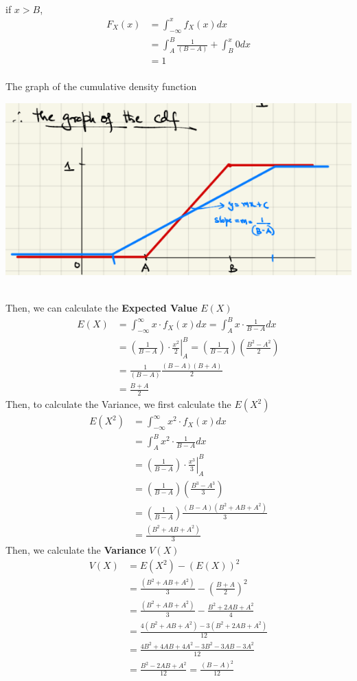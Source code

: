 \documentclass[11pt,oneside]{book}
\theoremstyle{break}
\theoremstyle{break}
\begin{document}
\hfill\\
if $x>B$, \begin{align*}
F_X(x)&=\int_{-\infty}^{x}f_X(x)dx\\
&=\int_{A}^{B} \frac{1}{(B-A)}+\int_{B}^{x}0dx\\
&=1
\end{align*}
\hfill\\
The graph of the cumulative density function
\begin{center}
\includegraphics[scale=0.5]{figures/cdf_graph}
\end{center}
\hfill\\
Then, we can calculate the \textbf{Expected Value} $E(X)$\begin{align*}
E(X)&=\int_{-\infty}^{\infty}x\cdot f_X(x)dx=\int_{A}^{B}x\cdot \frac{1}{B-A}dx\\
&=\left. \left( \frac{1}{B-A}\right)\cdot \frac{x^2}{2}\right|_{A}^{B} =\left( \frac{1}{B-A}\right) \left( \frac{B^2-A^2}{2}\right)\\
&=\frac{1}{(B-A)}\frac{(B-A)(B+A)}{2}\\
&=\frac{B+A}{2}
\end{align*}
Then, to calculate the Variance, we first calculate the $E(X^2)$\begin{align*}
E(X^2)&=\int_{-\infty}^{\infty}x^2\cdot f_X(x)dx\\
&=\int_{A}^{B}x^2\cdot \frac{1}{B-A}dx\\
&=\left. \left( \frac{1}{B-A}\right)\cdot \frac{x^3}{3}\right|_{A}^{B}\\
&=\left( \frac{1}{B-A}\right) \left( \frac{B^3-A^3}{3}\right)\\
&=\left( \frac{1}{B-A}\right) \frac{(B-A)(B^2+AB+A^2)}{3}\\
&=\frac{(B^2+AB+A^2)}{3}
\end{align*}
Then, we calculate the \textbf{Variance} $V(X)$\begin{align*}
V(X)&=E(X^2)-(E(X))^2\\
&= \frac{(B^2+AB+A^2)}{3}- \left(\frac{B+A}{2} \right)^2\\
&= \frac{(B^2+AB+A^2)}{3}-\frac{B^2+2AB+A^2}{4}\\
&=\frac{4(B^2+AB+A^2)-3(B^2+2AB+A^2)}{12}\\
&=\frac{4B^2+4AB+4A^2-3B^2-3AB-3A^2}{12}\\
&=\frac{B^2-2AB+A^2}{12}=\frac{(B-A)^2}{12}
\end{align*}
\end{document}
